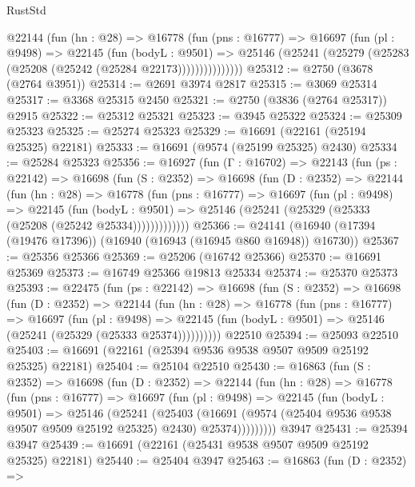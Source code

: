 \begin{lexlean}{RustStd}
\begin{coremodule}
            @22144
              (fun (hn : @28) =>
              @16778
                (fun (pns : @16777) =>
                @16697
                  (fun (pl : @9498) =>
                  @22145
                    (fun (bodyL : @9501) =>
                    @25146 (@25241 (@25279 (@25283 (@25208 (@25242 (@25284 @22173)))))))))))))))
@25312 := @2750 (@3678 (@2764 @3951))
@25314 := @2691 @3974 @2817
@25315 := @3069 @25314
@25317 := @3368 @25315 @2450
@25321 := @2750 (@3836 (@2764 @25317)) @2915
@25322 := @25312 @25321
@25323 := @3945 @25322
@25324 := @25309 @25323
@25325 := @25274 @25323
@25329 := @16691 (@22161 (@25194 @25325) @22181)
@25333 := @16691 (@9574 (@25199 @25325) @2430)
@25334 := @25284 @25323
@25356 := @16927
    (fun (Γ : @16702) =>
    @22143
      (fun (ps : @22142) =>
      @16698
        (fun (S : @2352) =>
        @16698
          (fun (D : @2352) =>
          @22144
            (fun (hn : @28) =>
            @16778
              (fun (pns : @16777) =>
              @16697
                (fun (pl : @9498) =>
                @22145
                  (fun (bodyL : @9501) =>
                  @25146 (@25241 (@25329 (@25333 (@25208 (@25242 @25334)))))))))))))
@25366 := @24141 (@16940 (@17394 (@19476 @17396)) (@16940 (@16943 (@16945 @860 @16948)) @16730))
@25367 := @25356 @25366
@25369 := @25206 (@16742 @25366)
@25370 := @16691 @25369
@25373 := @16749 @25366 @19813 @25334
@25374 := @25370 @25373
@25393 := @22475
    (fun (ps : @22142) =>
    @16698
      (fun (S : @2352) =>
      @16698
        (fun (D : @2352) =>
        @22144
          (fun (hn : @28) =>
          @16778
            (fun (pns : @16777) =>
            @16697
              (fun (pl : @9498) =>
              @22145 (fun (bodyL : @9501) => @25146 (@25241 (@25329 (@25333 @25374))))))))))
    @22510
@25394 := @25093 @22510
@25403 := @16691 (@22161 (@25394 @9536 @9538 @9507 @9509 @25192 @25325) @22181)
@25404 := @25104 @22510
@25430 := @16863
    (fun (S : @2352) =>
    @16698
      (fun (D : @2352) =>
      @22144
        (fun (hn : @28) =>
        @16778
          (fun (pns : @16777) =>
          @16697
            (fun (pl : @9498) =>
            @22145
              (fun (bodyL : @9501) =>
              @25146
                (@25241
                  (@25403
                    (@16691
                      (@9574 (@25404 @9536 @9538 @9507 @9509 @25192 @25325) @2430)
                      @25374)))))))))
    @3947
@25431 := @25394 @3947
@25439 := @16691 (@22161 (@25431 @9538 @9507 @9509 @25192 @25325) @22181)
@25440 := @25404 @3947
@25463 := @16863
    (fun (D : @2352) =>

\end{coremodule}
\end{lexlean}
